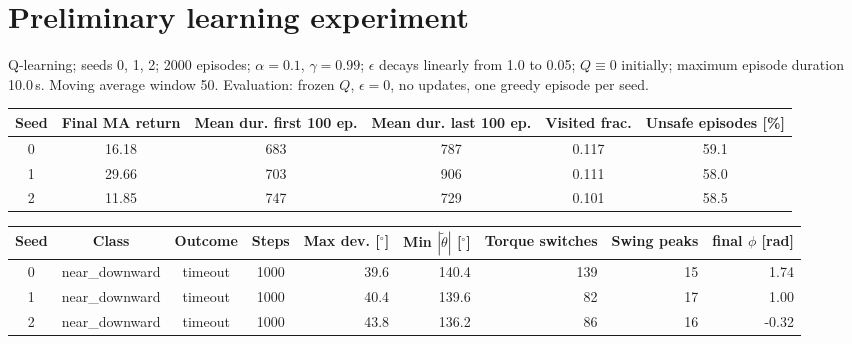 \documentclass[11pt]{article}
\newcommand{\nepisodes}{2000}
\newcommand{\maxepsec}{10.0}
\newcommand{\cfgalpha}{0.1}
\newcommand{\cfggamma}{0.99}
\newcommand{\epsstart}{1.0}
\newcommand{\epsend}{0.05}
\newcommand{\mawindow}{50}
\newcommand{\expseeds}{0, 1, 2}
\begin{document}
\section{Preliminary learning experiment}
Q-learning; seeds \expseeds; \nepisodes{} episodes; $\alpha=\cfgalpha$, $\gamma=\cfggamma$; $\epsilon$ decays linearly from \epsstart{} to \epsend{}; $Q\equiv0$ initially; maximum episode duration \maxepsec\,s. Moving average window \mawindow. Evaluation: frozen $Q$, $\epsilon=0$, no updates, one greedy episode per seed.
\begin{center}\small\begin{tabular}{cccccc}
\toprule
Seed & Final MA return & Mean dur. first 100 ep. & Mean dur. last 100 ep. & Visited frac. & Unsafe episodes [\%] \\
\midrule
0 & 16.18 & 683 & 787 & 0.117 & 59.1 \\
1 & 29.66 & 703 & 906 & 0.111 & 58.0 \\
2 & 11.85 & 747 & 729 & 0.101 & 58.5 \\
\bottomrule
\end{tabular}\end{center}
\begin{center}\small\begin{tabular}{ccccrrrrr}
\toprule
Seed & Class & Outcome & Steps & Max dev. [$^\circ$] & Min $|\widetilde\theta|$ [$^\circ$] & Torque switches & Swing peaks & final $\phi$ [rad] \\
\midrule
0 & near\_downward & timeout & 1000 & 39.6 & 140.4 & 139 & 15 & 1.74 \\
1 & near\_downward & timeout & 1000 & 40.4 & 139.6 & 82 & 17 & 1.00 \\
2 & near\_downward & timeout & 1000 & 43.8 & 136.2 & 86 & 16 & -0.32 \\
\bottomrule
\end{tabular}\end{center}
\end{document}
